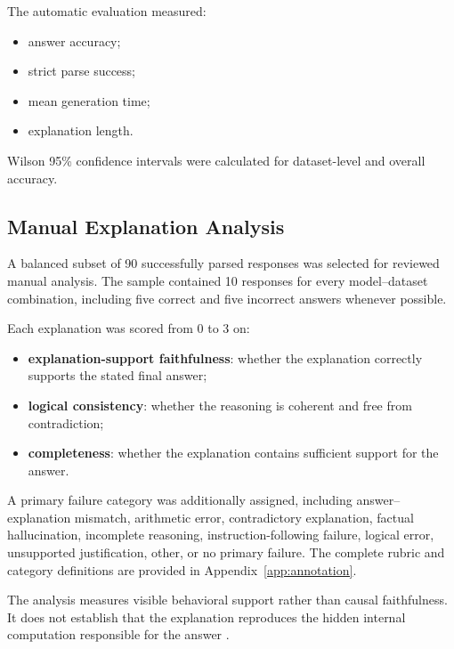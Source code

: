 \documentclass{article}
\begin{document}
The automatic evaluation measured:

\begin{itemize}
    \item answer accuracy;
    \item strict parse success;
    \item mean generation time;
    \item explanation length.
\end{itemize}

Wilson 95\% confidence intervals were calculated for dataset-level and
overall accuracy.

\subsection{Manual Explanation Analysis}

A balanced subset of 90 successfully parsed responses was selected for
reviewed manual analysis. The sample contained 10 responses for every
model--dataset combination, including five correct and five incorrect
answers whenever possible.

Each explanation was scored from 0 to 3 on:

\begin{itemize}
    \item \textbf{explanation-support faithfulness}: whether the
    explanation correctly supports the stated final answer;

    \item \textbf{logical consistency}: whether the reasoning is coherent
    and free from contradiction;

    \item \textbf{completeness}: whether the explanation contains
    sufficient support for the answer.
\end{itemize}

A primary failure category was additionally assigned, including
answer--explanation mismatch, arithmetic error, contradictory
explanation, factual hallucination, incomplete reasoning,
instruction-following failure, logical error, unsupported justification,
other, or no primary failure. The complete rubric and category
definitions are provided in Appendix~\ref{app:annotation}.

The analysis measures visible behavioral support rather than causal
faithfulness. It does not establish that the explanation reproduces the
hidden internal computation responsible for the answer
\cite{turpin2023language,lanham2023measuring,
parcalabescu2024measuring}.
\end{document}
